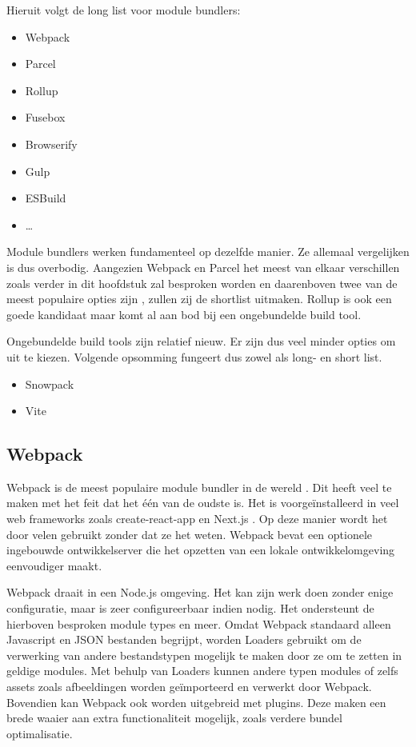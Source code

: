 Hieruit volgt de long list voor module bundlers:
\begin{itemize}
\item Webpack
\item Parcel
\item Rollup
\item Fusebox
\item Browserify
\item Gulp
\item ESBuild
\item …
\end{itemize}

Module bundlers werken fundamenteel op dezelfde manier. Ze allemaal vergelijken is dus overbodig. Aangezien Webpack en Parcel het meest van elkaar verschillen zoals verder in dit hoofdstuk zal besproken worden en daarenboven twee van de meest populaire opties zijn \autocite{stateofjs-2020}, zullen zij de shortlist uitmaken. Rollup is ook een goede kandidaat maar komt al aan bod bij een ongebundelde build tool.

Ongebundelde build tools zijn relatief nieuw. Er zijn dus veel minder opties om uit te kiezen. Volgende opsomming fungeert dus zowel als long- en short list.

\begin{itemize}
\item Snowpack
\item Vite
\end{itemize}

\subsection{Webpack}

Webpack \autocite{webpack-2014} is de meest populaire module bundler in de wereld \autocite{stateofjs-2020}. Dit heeft veel te maken met het feit dat het één van de oudste is. Het is voorgeïnstalleerd in veel \gls{web frameworks} zoals create-react-app \autocite{facebook-2021} en Next.js \autocite{vercel-no-date}. Op deze manier wordt het door velen gebruikt zonder dat ze het weten. Webpack bevat een optionele ingebouwde ontwikkelserver die het opzetten van een lokale ontwikkelomgeving eenvoudiger maakt.

Webpack draait in een Node.js omgeving. Het kan zijn werk doen zonder enige configuratie, maar is zeer configureerbaar indien nodig. Het ondersteunt de hierboven besproken module types en meer. Omdat Webpack standaard alleen \gls{Javascript} en \gls{JSON} bestanden begrijpt, worden Loaders gebruikt om de verwerking van andere bestandstypen mogelijk te maken door ze om te zetten in geldige modules. Met behulp van Loaders kunnen andere typen modules of zelfs assets zoals afbeeldingen worden geïmporteerd en verwerkt door Webpack. Bovendien kan Webpack ook worden uitgebreid met plugins. Deze maken een brede waaier aan extra functionaliteit mogelijk, zoals verdere bundel optimalisatie. 


